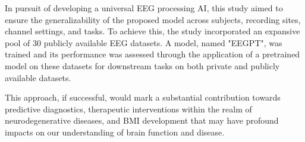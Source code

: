 In pursuit of developing a universal EEG processing AI, this study aimed to ensure the generalizability of the proposed model across subjects, recording sites, channel settings, and tasks. To achieve this, the study incorporated an expansive pool of 30 publicly available EEG datasets. A model, named "EEGPT", was trained and its performance was assessed through the application of a pretrained model on these datasets for downstream tasks on both private and publicly available datasets.

This approach, if successful, would mark a substantial contribution towards predictive diagnostics, therapeutic interventions within the realm of neurodegenerative diseases, and BMI development that may have profound impacts on our understanding of brain function and disease.

\label{sec:introduction}